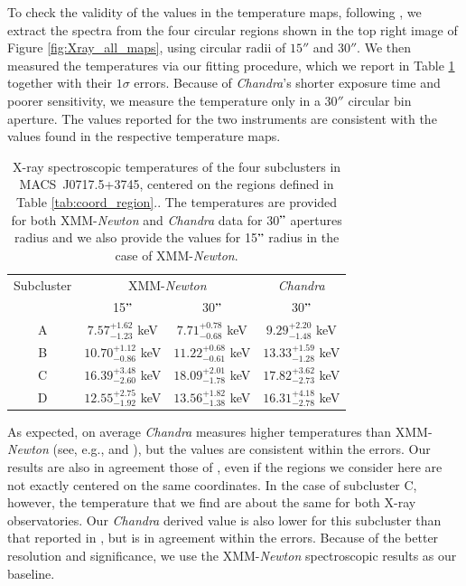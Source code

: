\documentclass[twocolumn,traditabstract]{aa}
\begin{document}
To check the validity of the values in the temperature maps, following \cite{wang2016}, we extract the spectra from the four circular regions shown in the top right image of Figure \ref{fig:Xray_all_maps}, using circular radii of $15''$ and $30''$. We then measured the temperatures via our fitting procedure, which we report in Table \ref{tab:subcluster_Tx_measurements} together with their $1\sigma$ errors. Because of \textit{Chandra}'s shorter exposure time and poorer sensitivity, we measure the temperature only in a $30''$ circular bin aperture. The values reported for the two instruments are consistent with the values found in the respective temperature maps.
\begin{table}[h]
\caption{{\footnotesize X-ray spectroscopic temperatures of the four subclusters in \mbox{MACS~J0717.5+3745}, centered on the regions defined in Table \ref{tab:coord_region}.}. The temperatures are provided for both XMM-\textit{Newton} and \textit{Chandra} data for 30$"$ apertures radius and we also provide the values for 15$"$ radius in the case of XMM-\textit{Newton}.}
\begin{center}
\begin{tabular}{cccc}
\hline
\hline
Subcluster & \multicolumn{2}{c}{XMM-\textit{Newton}} & \textit{Chandra} \\
 & 15$"$ & 30$"$ & 30$"$ \\
\hline
A & $  7.57^{+1.62}_{-1.23}$ keV & $  7.71^{+0.78}_{-0.68}$ keV & $  9.29^{+2.20}_{-1.48}$ keV \\
B & $10.70^{+1.12}_{-0.86}$ keV & $11.22^{+0.68}_{-0.61}$ keV & $13.33^{+1.59}_{-1.28}$ keV \\
C & $16.39^{+3.48}_{-2.60}$ keV & $18.09^{+2.01}_{-1.78}$ keV & $17.82^{+3.62}_{-2.73}$ keV \\
D & $12.55^{+2.75}_{-1.92}$ keV & $13.56^{+1.82}_{-1.38}$ keV & $16.31^{+4.18}_{-2.78}$ keV \\
\hline
\end{tabular}
\end{center}
\label{tab:subcluster_Tx_measurements}
\end{table}
As expected, on average \textit{Chandra} measures higher temperatures than XMM-\textit{Newton} (see, e.g., \citealt{martino2014} and \citealt{schellenberger2015}), but the values are consistent within the errors. Our results are also in agreement those of \cite{Sayers2013}, even if the regions we consider here are not exactly centered on the same coordinates. In the case of subcluster C, however, the temperature that we find are about the same for both X-ray observatories. Our \textit{Chandra} derived value is also lower for this subcluster than that reported in \cite{Sayers2013}, but is in agreement within the errors. Because of the better resolution and significance, we use the XMM-\textit{Newton} spectroscopic results as our baseline.
\end{document}
